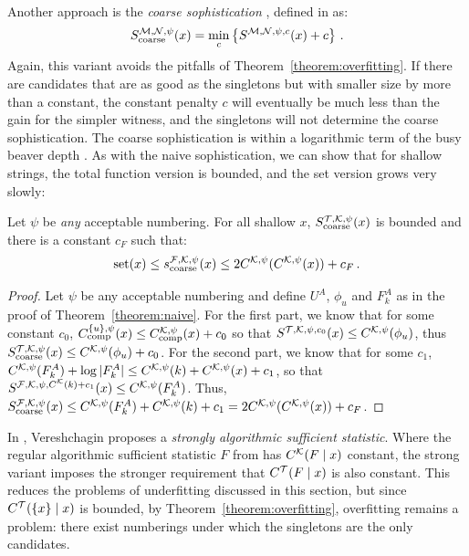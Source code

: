 Another approach is the \emph{coarse sophistication} \cite{antunes2009sophistication}, defined in \cite{mota2013sophistication} as:
\[
S^{{\cal M},{\cal N},\psi}_{\textnormal{coarse}}(x) = \min_c\left\{S^{{\cal M},{\cal N},\psi,c}(x) + c \right\} \,\text{.}
\]
Again, this variant avoids the pitfalls of Theorem~\ref{theorem:overfitting}. If there are candidates that are as good as the singletons but with smaller size by more than a constant, the constant penalty $c$ will eventually be much less than the gain for the simpler witness, and the singletons will not determine the coarse sophistication. The coarse sophistication is within a logarithmic term of the busy beaver depth \cite{antunes2009sophistication}. As with the naive sophistication, we can show that for shallow strings, the total function version is bounded, and the set version grows very slowly:
\begin{theorem}

Let $\psi$ be \emph{any} acceptable numbering. For all shallow $x$, $S_{\textnormal{coarse}}^{{\cal T},{\cal K},\psi}(x)$ is bounded and there is a constant $c_F$ such that:\belowdisplayskip=-12pt
\[
\text{set}(x) \leq s_{\textnormal{coarse}}^{{\cal F},{\cal K},\psi}(x) \leq 2 C^{{\cal K},\psi}(C^{{\cal K},\psi}(x)) + c_F \,\text{.}
\]\label{theorem:coarse}
\end{theorem}
\begin{proof}
Let $\psi$ be any acceptable numbering and define $U^A$, $\phi_u$ and $F^A_k$ as in the proof of Theorem~\ref{theorem:naive}. For the first part, we know that for some constant $c_0$, $C_{\textnormal{comp}}^{\{u\}, \psi}(x) \leq C_{\textnormal{comp}}^{{\cal K},\psi}(x) + c_0$ so that $S^{{\cal T}, {\cal K},\psi,c_0}(x) \leq C^{{\cal K},\psi}(\phi_u)$, thus $S_\text{coarse}^{{\cal T},{\cal K},\psi}(x) \leq C^{{\cal K},\psi}(\phi_u) + c_0$. For the second part, we know that for some $c_1$, $C^{{\cal K},\psi}(F^A_k) + \log|F^A_k| \leq C^{{\cal K},\psi}(k) + C^{{\cal K},\psi}(x)+ c_1$, so that $S^{{\cal F},{\cal K},\psi,C^{\cal K}(k)+c_1}(x) \leq C^{{\cal K},\psi}(F^A_k)$. Thus, $S_{\textnormal{coarse}}^{{\cal F},{\cal K},\psi}(x) \leq C^{{\cal K},\psi}(F^A_k) + C^{{\cal K},\psi}(k) + c_1 = 2 C^{{\cal K},\psi}(C^{{\cal K},\psi}(x)) + c_F$.
\end{proof}
In \cite{vereshchagin2013algorithmic}, Vereshchagin proposes a \emph{strongly algorithmic sufficient statistic}. Where the regular algorithmic sufficient statistic $F$ from \cite{gacs2001algorithmic} has $C^{\cal K}(F\mid x)$ constant, the strong variant imposes the stronger requirement that $C^{\cal T}(F\mid x)$ is also constant. This reduces the problems of underfitting discussed in this section, but since $C^{\cal T}(\{x\}\mid x)$ is bounded, by Theorem~\ref{theorem:overfitting}, overfitting remains a problem: there exist numberings under which the singletons are the only candidates.


